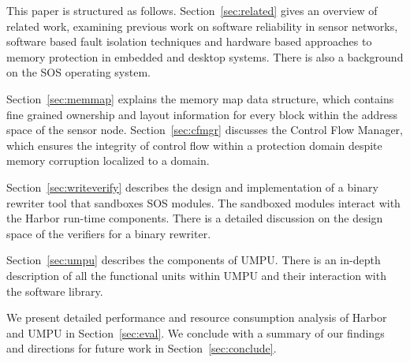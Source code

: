 This paper is structured as follows.
%
Section~\ref{sec:related} gives an overview of related work,
examining previous work on software reliability in sensor networks,
software based fault isolation techniques and hardware based
approaches to memory protection in embedded and desktop systems.
%
There is also a background on the SOS operating system. 

Section~\ref{sec:memmap} explains the memory map data structure, which
contains fine grained ownership and layout information for every block
within the address space of the sensor node. 
%
Section~\ref{sec:cfmgr} discusses the Control Flow Manager, which
ensures the integrity of control flow within a protection domain
despite memory corruption localized to a domain.

Section~\ref{sec:writeverify} describes the design and implementation
of a binary rewriter tool that sandboxes SOS modules.
%
The sandboxed modules interact with the Harbor run-time components.
%
There is a detailed discussion on the design space of the verifiers
for a binary rewriter.

Section~\ref{sec:umpu} describes the components of UMPU.
%
There is an in-depth 
description of all the functional units
within UMPU and their interaction with the software library.

We present detailed performance and resource consumption analysis of
Harbor and UMPU in Section~\ref{sec:eval}.
%
We conclude with a summary of our findings and directions for future
work in Section~\ref{sec:conclude}.
